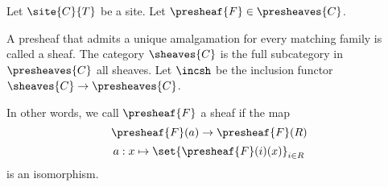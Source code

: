 \begin{definition}[Sheaves]
Let $\site{C}{T}$ be a site. 
Let $\presheaf{F} \in \presheaves{C}$.

A presheaf that admits a unique amalgamation for every matching family is called a sheaf.
The category $\sheaves{C}$ is the full subcategory in $\presheaves{C}$  all sheaves. 
Let $\incsh$ be the inclusion functor $\sheaves{C}\rightarrow \presheaves{C}$.

In other words, 
we call $\presheaf{F}$ a sheaf if the map 
\[\presheaf{F}(a) \rightarrow \presheaf{F}(R)\] 
\[ a: x \mapsto \set{ \presheaf{F}(i)(x) }_{i \in R} \]
is an isomorphism.
\end{definition}